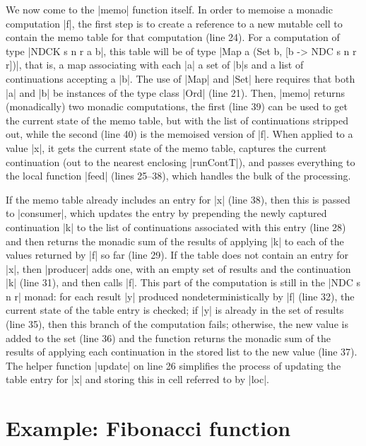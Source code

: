\documentclass[a4paper,10pt]{article}
\begin{document}
We now come to the |memo| function itself. In order to memoise a monadic computation |f|, the first step
is to create a reference to a new mutable cell to contain the memo table for that computation (line 24).
For a computation of type |NDCK s n r a b|, this table will be of type |Map a (Set b, [b -> NDC s n r r])|,
that is, a map associating with each |a| a set of |b|s and a list of continuations accepting a |b|.
The use of |Map| and |Set| here requires that both |a| and |b| be instances of the type class |Ord| (line 21). 
Then, |memo| returns (monadically) two monadic computations, the first (line 39) can be used to get the current state of the memo table,
but with the list of continuations stripped out, while the second (line 40) is the memoised version of |f|. 
When applied to a value |x|, it gets the current state of the memo table, captures the current continuation (out to the nearest
enclosing |runContT|), and passes everything to the local function |feed| (lines 25--38), which handles the bulk of the 
processing.

If the memo table already includes an entry
for |x| (line 38), then this is passed to |consumer|, which updates the entry by prepending the newly captured continuation |k|
to the list of continuations associated with this entry (line 28) and then returns the monadic sum of the results of applying |k| to each of the
values returned by |f| so far (line 29). If the table does not contain an entry for |x|, then |producer| adds one,
with an empty set of results and the continuation |k| (line 31), and then calls |f|. 
This part of the computation is still in the |NDC s n r| monad: for each result |y| produced nondeterministically
by |f| (line 32), the current state of the table entry is checked; if |y| is already in the set of results (line 35), then
this branch of the computation fails; otherwise, the new value is added to the set (line 36) and the function
returns the monadic sum of the results of applying each continuation in the stored list to the new value (line 37).
The helper function |update| on line 26 simplifies the process of updating the table entry for |x| and storing this in
cell referred to by |loc|.

\section{Example: Fibonacci function}
\end{document}
